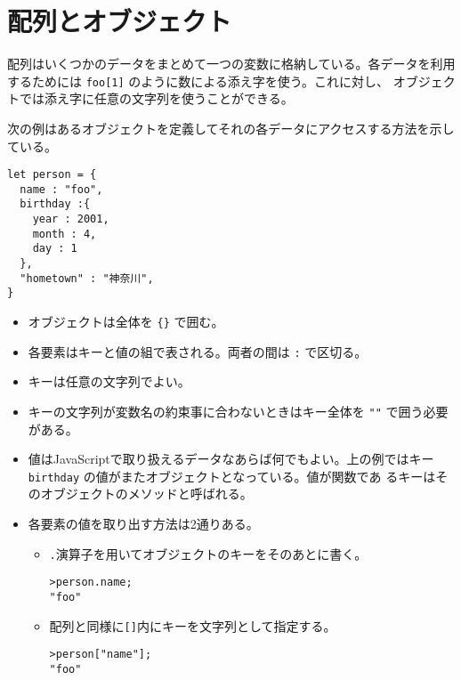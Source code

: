\section{配列とオブジェクト}
配列はいくつかのデータをまとめて一つの変数に格納している。各データを利用
するためには \verb+foo[1]+ のように数による添え字を使う。これに対し、
オブジェクトでは添え字に任意の文字列を使うことができる。
\begin{Exec}\label{Execconstructor}\upshape
次の例はあるオブジェクトを定義してそれの各データにアクセスする方法を示している。
\begin{Verbatim}
let person = {
  name : "foo",
  birthday :{
    year : 2001,
    month : 4,
    day : 1
  },
  "hometown" : "神奈川",
}
\end{Verbatim}
\begin{itemize}
 \item オブジェクトは全体を \verb+{}+ で囲む。
 \item 各要素はキーと値の組で表される。両者の間は \verb+:+ で区切る。
 \item キーは任意の文字列でよい。
 \item キーの文字列が変数名の約束事に合わないときはキー全体を \verb+""+
			 で囲う必要がある。
 \item 値はJavaScriptで取り扱えるデータなあらば何でもよい。上の例ではキー
       \verb+birthday+ の値がまたオブジェクトとなっている。値が関数であ
       るキーはそのオブジェクトのメソッドと呼ばれる。
 \item 各要素の値を取り出す方法は2通りある。
\begin{itemize}
 \item \verb+.+演算子を用いてオブジェクトのキーをそのあとに書く。
\begin{Verbatim}
>person.name;
"foo"
\end{Verbatim}
 \item 配列と同様に\verb+[]+内にキーを文字列として指定する。
\begin{Verbatim}
>person["name"];
"foo"
\end{Verbatim}
\end{itemize}


\end{itemize}
\end{Exec}
